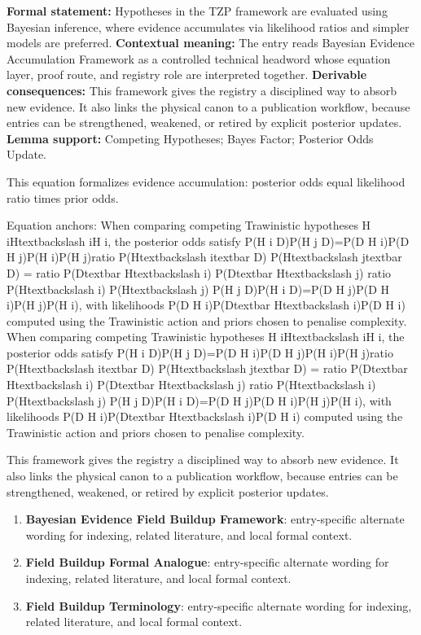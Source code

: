 \begingroup\footnotesize\setlength{\emergencystretch}{3em}\sloppy
\textbf{Formal statement:} Hypotheses in the TZP framework are evaluated using Bayesian inference, where evidence accumulates via likelihood ratios and simpler models are preferred. \textbf{Contextual meaning:} The entry reads Bayesian Evidence Accumulation Framework as a controlled technical headword whose equation layer, proof route, and registry role are interpreted together. \textbf{Derivable consequences:} This framework gives the registry a disciplined way to absorb new evidence. It also links the physical canon to a publication workflow, because entries can be strengthened, weakened, or retired by explicit posterior updates. \textbf{Lemma support:} Competing Hypotheses; Bayes Factor; Posterior Odds Update.\par
\endgroup

This equation formalizes evidence accumulation: posterior odds equal likelihood ratio times prior odds.

Equation anchors: When comparing competing Trawinistic hypotheses H iHtextbackslash iH i, the posterior odds satisfy P(H i D)P(H j D)=P(D H i)P(D H j)P(H i)P(H j)ratio P(Htextbackslash itextbar D) P(Htextbackslash jtextbar D) = ratio P(Dtextbar Htextbackslash i) P(Dtextbar Htextbackslash j) ratio P(Htextbackslash i) P(Htextbackslash j) P(H j D)P(H i D)=P(D H j)P(D H i)P(H j)P(H i), with likelihoods P(D H i)P(Dtextbar Htextbackslash i)P(D H i) computed using the Trawinistic action and priors chosen to penalise complexity. When comparing competing Trawinistic hypotheses H iHtextbackslash iH i, the posterior odds satisfy P(H i D)P(H j D)=P(D H i)P(D H j)P(H i)P(H j)ratio P(Htextbackslash itextbar D) P(Htextbackslash jtextbar D) = ratio P(Dtextbar Htextbackslash i) P(Dtextbar Htextbackslash j) ratio P(Htextbackslash i) P(Htextbackslash j) P(H j D)P(H i D)=P(D H j)P(D H i)P(H j)P(H i), with likelihoods P(D H i)P(Dtextbar Htextbackslash i)P(D H i) computed using the Trawinistic action and priors chosen to penalise complexity.

This framework gives the registry a disciplined way to absorb new evidence. It also links the physical canon to a publication workflow, because entries can be strengthened, weakened, or retired by explicit posterior updates.
\endgroup

\begingroup\footnotesize\sloppy
\begin{enumerate}[leftmargin=1.35em,itemsep=1pt,topsep=1pt,parsep=0pt]
\item \textbf{Bayesian Evidence Field Buildup Framework}: entry-specific alternate wording for indexing, related literature, and local formal context.
\item \textbf{Field Buildup Formal Analogue}: entry-specific alternate wording for indexing, related literature, and local formal context.
\item \textbf{Field Buildup Terminology}: entry-specific alternate wording for indexing, related literature, and local formal context.
\end{enumerate}
\endgroup

